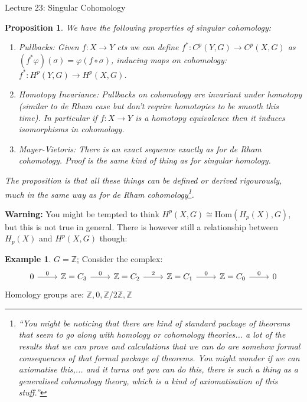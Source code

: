 \documentclass[10pt]{article}
\theoremstyle{plain}
\newtheorem{prop}[thm]{Proposition}
\theoremstyle{definition}
\newtheorem{exmp}[thm]{Example} %
\newcommand{\Hom}[2]{\text{Hom}\left(#1,#2\right)}
\newcommand{\Zint}{\mathbb{Z}}
\begin{document}
\begin{section}{Lecture 23: Singular Cohomology}
\begin{prop}
    We have the following properties of singular cohomology: 
    \begin{enumerate}
        \item Pullbacks: Given $f:X\to Y$ cts we can define $f^*:C^p(Y,G) \to C^p(X,G) $ as $(f^*\varphi)(\sigma) = \varphi(f\circ \sigma)$, inducing maps on cohomology: $f^*: H^p(Y,G) \to H^p(X,G)$.
        \item Homotopy Invariance: Pullbacks on cohomology are invariant under homotopy (similar to de Rham case but don't require homotopies to be smooth this time). In particular if $f:X\to Y$ is a homotopy equivalence then it induces isomorphisms in cohomology.
        \item Mayer-Vietoris: There is an exact sequence exactly as for de Rham cohomology. Proof is the same kind of thing as for singular homology.
    \end{enumerate}
    The proposition is that all these things can be defined or derived rigourously, much in the same way as for de Rham cohomology\footnote{``You might be noticing that there are kind of standard package of theorems that seem to go along with homology or cohomology theories... a lot of the results that we can prove and calculations that we can do are somehow formal consequences of that formal package of theorems. You might wonder if we can axiomatise this,... and it turns out you can do this, there is such a thing as a generalised cohomology theory, which is a kind of axiomatisation of this stuff.'' }.
\end{prop}
\noindent
\textbf{Warning:} You might be tempted to think $H^p(X,G) \cong \Hom{H_p(X)}{G}$, but this is not true in general. There is however still a relationship between $H_p(X) $ and $H^p(X,G)$ though:
\\
\begin{exmp}
    \underline{$G=\Zint$:} Consider the complex:
    $$%
    \begin{tikzcd}
    0 \arrow[r, "0"] & \mathbb{Z} = C_3 \arrow[r, "0"] & \mathbb{Z} = C_2 \arrow[r, " 2"] & \mathbb{Z} = C_1 \arrow[r, "0"] & \mathbb{Z} = C_0 \arrow[r, "0"] & 0
    \end{tikzcd}$$
    Homology groups are: $\Zint, 0, \Zint / 2\Zint, \Zint$\\

\end{exmp}
\end{section}
\end{document}
